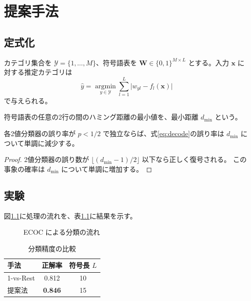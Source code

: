 \chapter{提案手法}\label{chap:method}

\section{定式化}

カテゴリ集合を $\mathcal{Y} = \{1, \dots, M\}$、符号語表を
$\bm{W} \in \{0,1\}^{M \times L}$ とする。入力 $\bm{x}$ に対する推定カテゴリは
\begin{equation}
  \hat{y} = \operatorname*{argmin}_{y \in \mathcal{Y}} \sum_{l=1}^{L} \bigl| w_{yl} - f_l(\bm{x}) \bigr|
  \label{eq:decode}
\end{equation}
で与えられる。

\begin{definition}
符号語表の任意の2行の間のハミング距離の最小値を、最小距離 $d_{\min}$ という。
\end{definition}

\begin{theorem}\label{thm:bound}
各2値分類器の誤り率が $p < 1/2$ で独立ならば、式\eqref{eq:decode}の誤り率は
$d_{\min}$ について単調に減少する。
\end{theorem}

\begin{proof}
2値分類器の誤り数が $\lfloor (d_{\min}-1)/2 \rfloor$ 以下なら正しく復号される。
この事象の確率は $d_{\min}$ について単調に増加する。
\end{proof}

\section{実験}

図\ref{fig:pipeline}に処理の流れを、表\ref{tab:result}に結果を示す。

\begin{figure}[tb]
  \centering
  \caption{ECOC による分類の流れ}\label{fig:pipeline}
\end{figure}

\begin{table}[tb]
  \centering
  \caption{分類精度の比較}\label{tab:result}
  \begin{tabular}{lcc}
    \toprule
    手法 & 正解率 & 符号長 $L$ \\
    \midrule
    1-vs-Rest & 0.812 & 10 \\
    提案法    & \textbf{0.846} & 15 \\
    \bottomrule
  \end{tabular}
\end{table}
